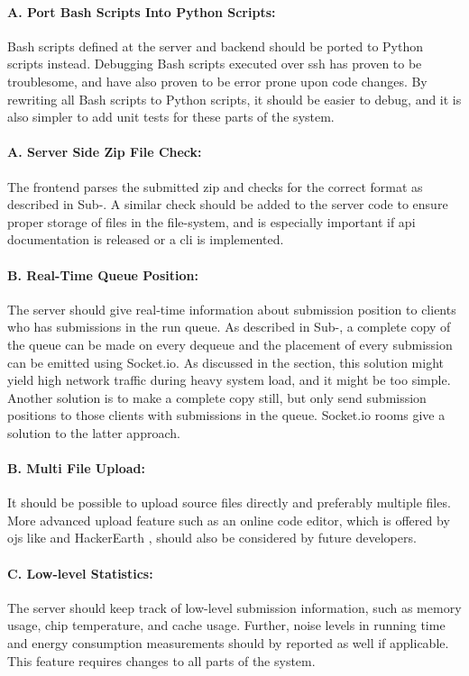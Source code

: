 \paragraph*{A. Port Bash Scripts Into Python Scripts:} Bash scripts defined at the server and backend should be ported to Python scripts instead. Debugging Bash scripts executed over \gls{ssh} has proven to be troublesome, and have also proven to be error prone upon code changes. By rewriting all Bash scripts to Python scripts, it should be easier to debug, and it is also simpler to add unit tests for these parts of the system.

\paragraph*{A. Server Side Zip File Check:} The frontend parses the submitted zip and checks for the correct format as described in Sub-. A similar check should be added to the server code to ensure proper storage of files in the file-system, and is especially important if \gls{api} documentation is released or a \gls{cli} is implemented.

\paragraph*{B. Real-Time Queue Position:} The server should give real-time information about submission position to clients who has submissions in the run queue. As described in Sub-, a complete copy of the queue can be made on every dequeue and the placement of every submission can be emitted using Socket.io. As discussed in the section, this solution might yield high network traffic during heavy system load, and it might be too simple. Another solution is to make a complete copy still, but only send submission positions to those clients with submissions in the queue. Socket.io rooms give a solution to the latter approach.

\paragraph*{B. Multi File Upload:} It should be possible to upload source files directly and preferably multiple files. More advanced upload feature such as an online code editor, which is offered by \glspl{oj} like \cite{KATTIS} and HackerEarth \cite{HACKEREARTH}, should also be considered by future developers.

\paragraph*{C. Low-level Statistics:} The server should keep track of low-level submission information, such as memory usage, chip temperature, and cache usage. Further, noise levels in running time and energy consumption measurements should by reported as well if applicable. This feature requires changes to all parts of the system.

